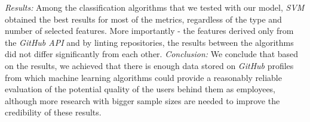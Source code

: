 {\newline
\noindent\textit{Results:}
Among the classification algorithms that we tested with our model, \emph{SVM} obtained the best results for most of the metrics, regardless of the type and number of selected features. More importantly - the features derived only from the \emph{GitHub API} and by linting repositories, the results between the algorithms did not differ significantly from each other.
\newline
\noindent\textit{Conclusion:}
We conclude that based on the results, we achieved that there is enough data stored on \emph{GitHub} profiles from which machine learning algorithms could provide a reasonably reliable evaluation of the potential quality of the users behind them as employees, although more research with bigger sample sizes are needed to improve the credibility of these results.
}
